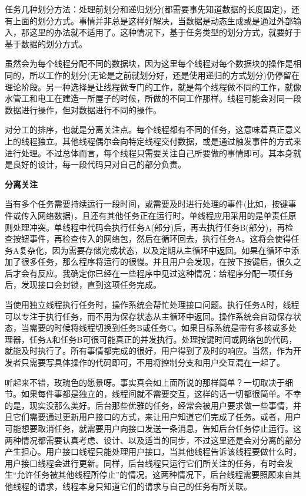 任务几种划分方法：处理前划分和递归划分(都需要事先知道数据的长度固定)，还有上面的划分方式。事情并非总是这样好解决，当数据是动态生成或是通过外部输入，那这里的办法就不适用了。这种情况下，基于任务类型的划分方式，就要好于基于数据的划分方式。


虽然会为每个线程分配不同的数据块，因为这里每个线程对每个数据块的操作是相同的，所以工作的划分(无论是之前就划分好，还是使用递归的方式划分)仍停留在理论阶段。另一种选择是让线程做专门的工作，就是每个线程做不同的工作，就像水管工和电工在建造一所屋子的时候，所做的不同工作那样。线程可能会对同一段数据进行操作，但对数据进行不同的操作。

对分工的排序，也就是分离关注点。每个线程都有不同的任务，这意味着真正意义上的线程独立。其他线程偶尔会向特定线程交付数据，或是通过触发事件的方式来进行处理。不过总体而言，每个线程只需要关注自己所要做的事情即可。其本身就是良好的设计，每一段代码只对自己的部分负责。

\textbf{分离关注}

当有多个任务需要持续运行一段时间，或需要及时进行处理的事件(比如，按键事件或传入网络数据)，且还有其他任务正在运行时，单线程应用采用的是单责任原则处理冲突。单线程中代码会执行任务A(部分)后，再去执行任务B(部分)，再检查按钮事件，再检查传入的网络包，然后在循环回去，执行任务A。这将会使得任务A复杂化，因为需要存储完成状态，以及定期从主循环中返回。如果在循环中添加了很多任务，那么程序将运行的很慢。并且用户会发现，在按下按键后，很久之后才会有反应。我确定你已经在一些程序中见过这种情况：给程序分配一项任务后，发现接口会封锁，直到这项任务完成。

当使用独立线程执行任务时，操作系统会帮忙处理接口问题。执行任务A时，线程可以专注于执行任务，而不用为保存状态从主循环中返回。操作系统会自动保存状态，当需要的时候将线程切换到任务B或任务C。如果目标系统是带有多核或多处理器，任务A和任务B可很可能真正的并发执行。处理按键时间或网络包的代码，就能及时执行了。所有事情都完成的很好，用户得到了及时的响应。当然，作为开发者只需要写具体操作的代码即可，不用将控制分支和用户交互混在一起了。

听起来不错，玫瑰色的愿景呀。事实真会如上面所说的那样简单？一切取决于细节。如果每件事都是独立的，线程间就不需要交互，这样的话一切都很简单。不幸的是，现实没那么美好。后台那些优雅的任务，经常会被用户要求做一些事情，并且它们需要通过更新用户接口的方式，来让用户知道它们完成了任务。或者，用户可能想要取消任务，就需要用户向接口发送一条消息，告知后台任务停止运行。这两种情况都需要认真考虑、设计、以及适当的同步，不过这里还是会对分离的部分产生担心。用户接口线程只能处理用户接口，当其他线程告诉该线程要做什么时，用户接口线程会进行更新。同样，后台线程只运行它们所关注的任务，有时会发生“允许任务被其他线程所停止”的情况。这两种情况下，后台线程需要照顾来自其他线程的请求，线程本身只知道它们的请求与自己的任务有所关联。

